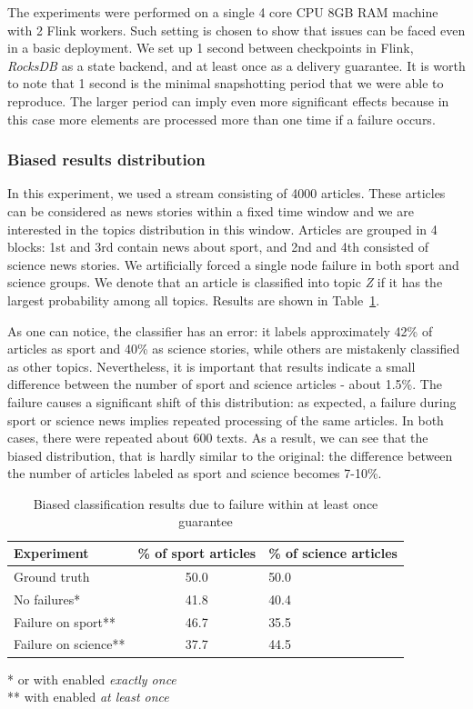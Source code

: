 The experiments were performed on a single 4 core CPU 8GB RAM machine with 2 Flink workers. Such setting is chosen to show that issues can be faced even in a basic deployment. We set up 1 second between checkpoints in Flink, {\em RocksDB} as a state backend, and at least once as a delivery guarantee. It is worth to note that 1 second is the minimal snapshotting period that we were able to reproduce. The larger period can imply even more significant effects because in this case more elements are processed more than one time if a failure occurs.

\subsubsection{Biased results distribution}

In this experiment, we used a stream consisting of 4000 articles. These articles can be considered as news stories within a fixed time window and we are interested in the topics distribution in this window. Articles are grouped in 4 blocks: 1st and 3rd contain news about sport, and 2nd and 4th consisted of science news stories. We artificially forced a  single node failure in both sport and science groups. We denote that an article is classified into topic {\em Z} if it has the largest probability among all topics. Results are shown in Table~\ref{biased_results}.

 As one can notice, the classifier has an error: 
it labels approximately 42\% of articles as sport and 40\% as science stories, while others are mistakenly classified as other topics. Nevertheless, it is important that results indicate a small difference between the number of sport and science articles - about 1.5\%. The failure causes a significant shift of this distribution: as expected, a failure during sport or science news implies repeated processing of the same articles. In both cases, there were repeated about 600 texts. As a result, we can see that the biased distribution, that is hardly similar to the original: the difference between the number of articles labeled as sport and science becomes 7-10\%. 

\begin{table}[htbp]
\caption{Biased classification results due to failure within at least once guarantee}
\begin{threeparttable}
\begin{tabular}{lcl}
Experiment    & \% of sport articles & \% of science articles    \\
\hline
Ground truth   &   50.0    &   50.0    \\
No failures*   &   41.8    &   40.4    \\
Failure on sport**   &   46.7    &   35.5    \\
Failure on science**   &   37.7    &   44.5    \\
\end{tabular}
* or with enabled {\em exactly once} \\
** with enabled {\em at least once}
\end{threeparttable}
\label{biased_results}
\end{table}

